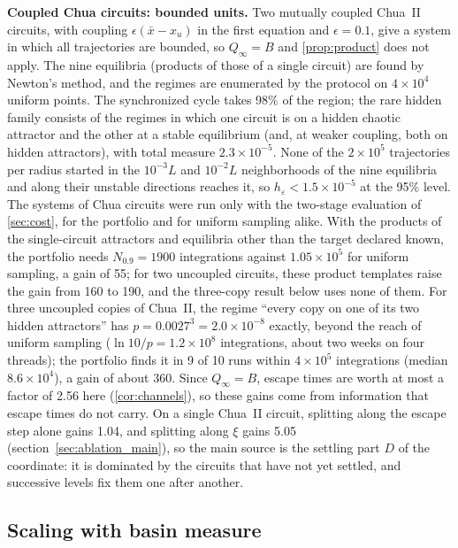\textbf{Coupled Chua circuits: bounded units.} Two mutually coupled Chua~II circuits, with coupling $\epsilon(\bar x-x_u)$ in the first equation and $\epsilon=0.1$, give a system in which all trajectories are bounded, so $Q_\infty=B$ and \cref{prop:product} does not apply. The nine equilibria (products of those of a single circuit) are found by Newton's method, and the regimes are enumerated by the protocol on $4\times10^4$ uniform points. The synchronized cycle takes 98\% of the region; the rare hidden family consists of the regimes in which one circuit is on a hidden chaotic attractor and the other at a stable equilibrium (and, at weaker coupling, both on hidden attractors), with total measure $2.3\times10^{-5}$. None of the $2\times10^5$ trajectories per radius started in the $10^{-3}L$ and $10^{-2}L$ neighborhoods of the nine equilibria and along their unstable directions reaches it, so $h_\varepsilon<1.5\times10^{-5}$ at the 95\% level. The systems of Chua circuits were run only with the two-stage evaluation of \cref{sec:cost}, for the portfolio and for uniform sampling alike. With the products of the single-circuit attractors and equilibria other than the target declared known, the portfolio needs $N_{0.9}=1900$ integrations against $1.05\times10^5$ for uniform sampling, a gain of 55; for two uncoupled circuits, these product templates raise the gain from 160 to 190, and the three-copy result below uses none of them. For three uncoupled copies of Chua~II, the regime ``every copy on one of its two hidden attractors'' has $p=0.0027^3=2.0\times10^{-8}$ exactly, beyond the reach of uniform sampling ($\ln10/p=1.2\times10^8$ integrations, about two weeks on four threads); the portfolio finds it in 9 of 10 runs within $4\times10^5$ integrations (median $8.6\times10^4$), a gain of about 360. Since $Q_\infty=B$, escape times are worth at most a factor of 2.56 here (\cref{cor:channels}), so these gains come from information that escape times do not carry. On a single Chua~II circuit, splitting along the escape step alone gains 1.04, and splitting along $\xi$ gains 5.05 (section~\ref{sec:ablation_main}), so the main source is the settling part $D$ of the coordinate: it is dominated by the circuits that have not yet settled, and successive levels fix them one after another.

\subsection{Scaling with basin measure}\label{sec:scaling_p}


